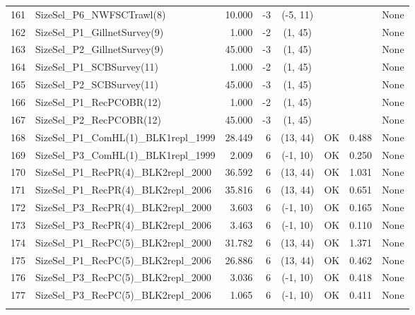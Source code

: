\documentclass[12pt,]{article}
\begin{document}
\begin{landscape}
\begin{longtable}{rlrrcccl}
  161 & SizeSel\_P6\_NWFSCTrawl(8) & 10.000 & -3 & (-5, 11) &  &  & None \\ 
  162 & SizeSel\_P1\_GillnetSurvey(9) & 1.000 & -2 & (1, 45) &  &  & None \\ 
  163 & SizeSel\_P2\_GillnetSurvey(9) & 45.000 & -3 & (1, 45) &  &  & None \\ 
  164 & SizeSel\_P1\_SCBSurvey(11) & 1.000 & -2 & (1, 45) &  &  & None \\ 
  165 & SizeSel\_P2\_SCBSurvey(11) & 45.000 & -3 & (1, 45) &  &  & None \\ 
  166 & SizeSel\_P1\_RecPCOBR(12) & 1.000 & -2 & (1, 45) &  &  & None \\ 
  167 & SizeSel\_P2\_RecPCOBR(12) & 45.000 & -3 & (1, 45) &  &  & None \\ 
  168 & SizeSel\_P1\_ComHL(1)\_BLK1repl\_1999 & 28.449 & 6 & (13, 44) & OK & 0.488 & None \\ 
  169 & SizeSel\_P3\_ComHL(1)\_BLK1repl\_1999 & 2.009 & 6 & (-1, 10) & OK & 0.250 & None \\ 
  170 & SizeSel\_P1\_RecPR(4)\_BLK2repl\_2000 & 36.592 & 6 & (13, 44) & OK & 1.031 & None \\ 
  171 & SizeSel\_P1\_RecPR(4)\_BLK2repl\_2006 & 35.816 & 6 & (13, 44) & OK & 0.651 & None \\ 
  172 & SizeSel\_P3\_RecPR(4)\_BLK2repl\_2000 & 3.603 & 6 & (-1, 10) & OK & 0.165 & None \\ 
  173 & SizeSel\_P3\_RecPR(4)\_BLK2repl\_2006 & 3.463 & 6 & (-1, 10) & OK & 0.110 & None \\ 
  174 & SizeSel\_P1\_RecPC(5)\_BLK2repl\_2000 & 31.782 & 6 & (13, 44) & OK & 1.371 & None \\ 
  175 & SizeSel\_P1\_RecPC(5)\_BLK2repl\_2006 & 26.886 & 6 & (13, 44) & OK & 0.462 & None \\ 
  176 & SizeSel\_P3\_RecPC(5)\_BLK2repl\_2000 & 3.036 & 6 & (-1, 10) & OK & 0.418 & None \\ 
  177 & SizeSel\_P3\_RecPC(5)\_BLK2repl\_2006 & 1.065 & 6 & (-1, 10) & OK & 0.411 & None \\ 
   \hline
\hline
\label{tab:model_params}
\end{longtable}
\end{landscape}

\FloatBarrier

\newpage
\end{document}
